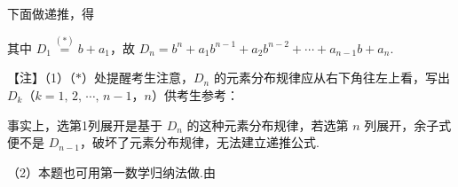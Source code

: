 下面做递推，得

其中 $D_1\overset{(*)}{=}b+a_1$，故 $D_n=b^n+a_1b^{n-1}+a_2b^{n-2}+\cdots+a_{n-1}b+a_n$.

\begin{fnote}
【注】（1）（$*$）处提醒考生注意，$D_n$ 的元素分布规律应从右下角往左上看，写出 $D_k$（$k=1,\,2,\,\cdots,\,n-1$，$n$）供考生参考：

事实上，选第1列展开是基于 $D_n$ 的这种元素分布规律，若选第 $n$ 列展开，余子式便不是 $D_{n-1}$，破坏了元素分布规律，无法建立递推公式.

（2）本题也可用第一数学归纳法做.由
\end{fnote}
